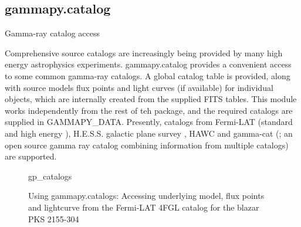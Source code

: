 \subsection{gammapy.catalog}
\label{ssec:gammapy-catalog}
Gamma-ray catalog access

Comprehensive source catalogs are increasingly being provided by many high energy astrophysics experiments. gammapy.catalog provides a convenient access to some common gamma-ray catalogs. A global catalog table is provided, along with source models flux points and light curves (if available) for individual objects, which are internally created from the supplied FITS tables. This module works independently from the rest of teh package, and the required catalogs are supplied in GAMMAPY_DATA. Presently, catalogs from Fermi-LAT (standard \citep{3FGL, 4FGL} and high energy \citep{2FHL, 3FHL}), H.E.S.S. galactic plane survey \citep{HGPS}, HAWC \citep{2HWC, 3HWC} and gamma-cat (\citep{gamma-cat}; an open source gamma ray catalog combining information from multiple catalogs) are supported. 

\begin{figure}
	{gp_catalogs}
	\caption{Using gammapy.catalogs: Accessing underlying model, flux points and lightcurve from the Fermi-LAT 4FGL catalog for the blazar PKS 2155-304}
	\label{codeexample:data}
\end{figure}
